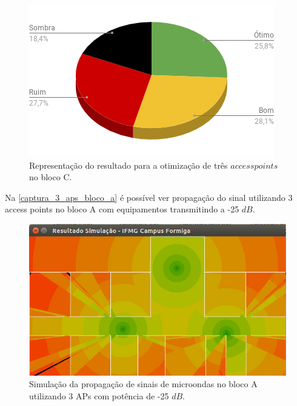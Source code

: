 \documentclass[
	12pt,				%
	twoside,			%
	a4paper,			%
	english,			%
	french,				%
	spanish,			%
	brazil				%
	]{abntex2}
\begin{document}
\begin{figure}[ht]
    \caption{\label{percent_bloco_c_3} Representação do resultado para a otimização de três $access points$ no bloco C.}
    \begin{center}
        \includegraphics[scale=0.7]{imagens/percent-bloco-c-3.png}
    \end{center}
\end{figure}

Na \autoref{captura_3_aps_bloco_a} é possível ver propagação do sinal
utilizando 3 access points no bloco A com equipamentos transmitindo a
-25 \(dB\).

\begin{figure}[ht]
    \caption{\label{captura_3_aps_bloco_a} Simulação da propagação de sinais de microondas no bloco A utilizando 3 APs com potência de -25 $dB$.
    }
    \begin{center}
        \includegraphics[scale=0.7]{imagens/captura-3-aps-bloco-a.jpg}
    \end{center}
\end{figure}
\end{document}
